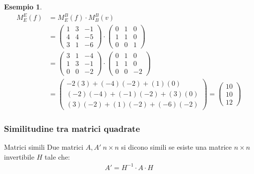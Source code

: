 \documentclass[a4paper]{article}
\theoremstyle{definition}
\newtheorem*{es}{Esempio}
\begin{document}
\begin{es}
	\begin{align*}
		M_E^E(f) & = M_E^B(f) \cdot M_B^B(v) \\
		          & = \begin{pmatrix}
			          1 & 3 & -1 \\
			          4 & 4 & -5 \\
			          3 & 1 & -6
		          \end{pmatrix} \cdot \begin{pmatrix}
			          0 & 1 & 0 \\
			          1 & 1 & 0 \\
			          0 & 0 & 1
		          \end{pmatrix} \\
		          & = \begin{pmatrix}
			          3 & 1 & -4 \\
			          1 & 3 & -1 \\
			          0 & 0 & -2
		          \end{pmatrix} \cdot \begin{pmatrix}
			          0 & 1 & 0 \\
			          1 & 1 & 0 \\
			          0 & 0 & -2
		          \end{pmatrix} \\
		          & = \begin{pmatrix}
			          -2(3) + (-4)(-2) + (1)(0) \\
			          (-2)(-4) + (-1)(-2) + (3)(0) \\
			          (3)(-2) + (1)(-2) + (-6)(-2)
		          \end{pmatrix} = \begin{pmatrix}
		          		10 \\
		          		10 \\
		          		12
		          	\end{pmatrix}
	\end{align*}
\end{es}

\subsubsection{Similitudine tra matrici quadrate}
\begin{deff}{Matrici simili}{}
	Due matrici $A, A' \ n \times n$ si dicono simili se esiste una matrice $n \times n$ invertibile $H$ tale che:
	\begin{align*}
		A' = H^{-1} \cdot A \cdot H
	\end{align*}
\end{deff}
\end{document}
